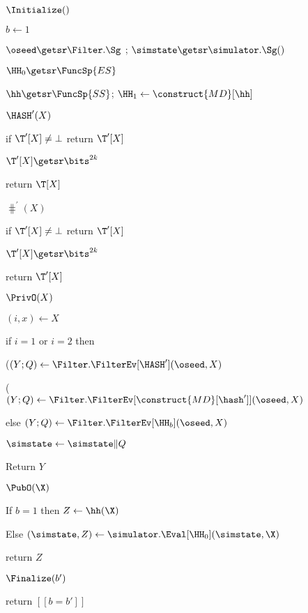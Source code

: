 \begin{figure}
{		\begin{algorithm-initial}{$\Initialize()$}
			\item $b \gets 1$
			\item $\oseed \getsr \Filter.\Sg$ ; $\simstate \getsr \simulator.\Sg()$
			\item $\HH_0 \getsr \FuncSp{ES}$
			\item $\hh \getsr \FuncSp{SS}$; $\HH_1 \gets \construct{MD}[\hh]$ 
		\end{algorithm-initial}
		\ExptSepSpace
		\begin{algorithm-subsequent}{$\HASH^{\prime}(X)$ }
			\item[]
			\item if $\T^{\prime}[X] \neq \bot$ return $\T^{\prime}[X]$
			\item $\T^{\prime}[X] \getsr \bits^{2k}$
			\item return $\T[X]$
		\end{algorithm-subsequent}
		\ExptSepSpace
		\begin{algorithm-subsequent}{$\hash^{\prime}(X)$ }
			\item[]
			\item if $\T^{\prime}[X] \neq \bot$ return $\T^{\prime}[X]$
			\item $\T^{\prime}[X] \getsr \bits^{2k}$
			\item return $\T^{\prime}[X]$
		\end{algorithm-subsequent}
		\ExptSepSpace
		\begin{algorithm-subsequent}{$\PrivO(X)$}
			\item $(i, x) \gets X$
			\item if $i =1$ or $i=2$ then 
			\item \quad ($(Y;Q) \gets \Filter.\FilterEv[\HASH^{\prime}](\oseed,X)$ 
			\item \quad ($(Y;Q) \gets \Filter.\FilterEv[\construct{MD}[\hash^{\prime}]](\oseed, X)$
			\item else $(Y;Q) \gets \Filter.\FilterEv[\HH_b](\oseed,X)$
			\item $\simstate\gets\simstate\|Q$  
			\item Return $Y$
		\end{algorithm-subsequent}	
		\ExptSepSpace
		\begin{algorithm-subsequent}{$\PubO(\X)$}
			\item If $b=1$ then  $Z\gets \hh(\X)$
			\item Else $(\simstate,Z) \gets \simulator.\Eval[\HH_0] (\simstate,\X)$
			\item return $Z$
		\end{algorithm-subsequent}
		\ExptSepSpace
		\begin{algorithm-subsequent}{$\Finalize(b')$}
			\item return $[[b = b']]$
		\end{algorithm-subsequent}
		
}
\end{figure}

